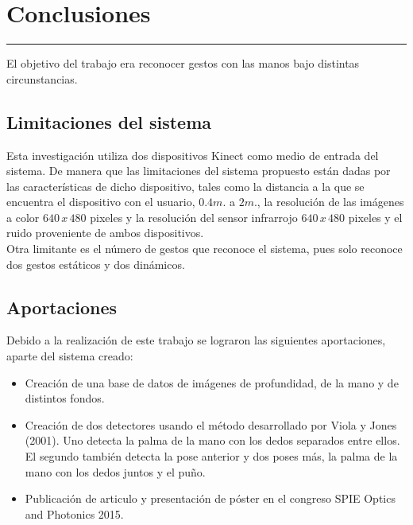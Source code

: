 \chapter{Conclusiones}\label{capit:cap6}
\vspace{-2.0325ex}%
\noindent
\rule{\textwidth}{0.5pt}
\vspace{-5.5ex}%
\newcommand{\pushline}{\Indp}%

El objetivo del trabajo era reconocer gestos con las manos bajo distintas circunstancias. 


\section{Limitaciones del sistema}

Esta investigación utiliza dos dispositivos Kinect como medio de entrada del sistema. De  manera que las limitaciones del sistema propuesto están dadas por las características de dicho dispositivo, tales como la distancia a la que se encuentra el dispositivo con el usuario, $0.4m.$ a $2m.$, la resolución de las imágenes a color $640 \, x \, 480$ pixeles y la resolución del sensor infrarrojo $640 \, x \, 480$ pixeles y el ruido proveniente de ambos dispositivos.\\

Otra limitante es el número de gestos que reconoce el sistema, pues solo reconoce dos gestos estáticos y dos dinámicos.

\section{Aportaciones}  

Debido a la realización de este trabajo se lograron las siguientes aportaciones, aparte del sistema creado: 
 
\begin{itemize}
\item Creación de una base de datos de imágenes de profundidad, de la mano y de distintos fondos.   

\item Creación de dos detectores usando el método desarrollado por Viola y Jones (2001). Uno detecta la palma de la mano con los dedos separados entre ellos. El segundo también detecta la pose anterior y dos poses más, la palma de la mano con los dedos juntos y el puño. 

\item Publicación de articulo y presentación de póster en el congreso SPIE Optics and Photonics 2015.     

\end{itemize}


